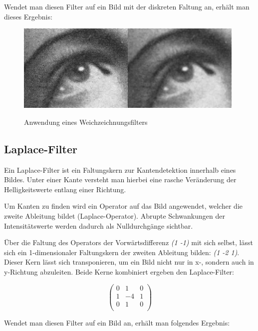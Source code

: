 Wendet man diesen Filter auf ein Bild mit der diskreten Faltung an, erhält man dieses Ergebnis:

\begin{figure}[ht]
   \centering
     \includegraphics[width=11cm]{Bilder/Gaussian_Blur} \\
 \caption{Anwendung eines Weichzeichnungsfilters}
 \label{fig:Blur}
\end{figure}

\subsection{Laplace-Filter}
Ein Laplace-Filter ist ein Faltungskern zur Kantendetektion innerhalb eines Bildes.
Unter einer Kante versteht man hierbei eine rasche Veränderung der Helligkeitswerte entlang einer Richtung.

Um Kanten zu finden wird ein Operator auf das Bild angewendet, welcher die zweite Ableitung bildet (Laplace-Operator). Abrupte Schwankungen der Intensitätswerte werden dadurch als Nulldurchgänge sichtbar.

Über die Faltung des Operators der Vorwärtsdifferenz {\em (1 -1)} mit sich selbst, lässt sich ein 1-dimensionaler Faltungskern der zweiten Ableitung bilden: {\em (1 -2 1)}.
Dieser Kern lässt sich transponieren, um ein Bild nicht nur in x-, sondern auch in y-Richtung abzuleiten.
Beide Kerne kombiniert ergeben den Laplace-Filter:

$$ \left( \begin{array}{rrr}
0 & 1 & 0 \\
1 & -4 & 1 \\
0 & 1 & 0 \\
\end{array}\right) $$

Wendet man diesen Filter auf ein Bild an, erhält man folgendes Ergebnis:

